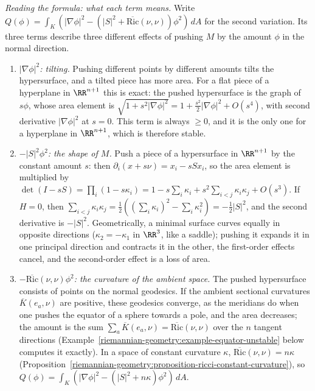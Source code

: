 \begin{remark}\label{riemannian-geometry:remark-variation-area-riemannian}
\emph{Reading the formula: what each term means.} Write $Q(\phi) = \int_K(|\nabla\phi|^2 - (|S|^2 + \overline{\mathrm{Ric}}(\nu, \nu))\phi^2)\,dA$ for the second variation. Its three terms
describe three different effects of pushing $M$ by the amount $\phi$ in the normal direction.
\begin{enumerate}
\item \emph{$|\nabla\phi|^2$: tilting.} Pushing different points by different amounts tilts the hypersurface, and a tilted piece has more area. For a flat piece of a hyperplane in
$\RR^{n+1}$ this is exact: the pushed hypersurface is the graph of $s\phi$, whose area element is $\sqrt{1 + s^2|\nabla\phi|^2} = 1 + \frac{s^2}2|\nabla\phi|^2 + O(s^4)$, with second
derivative $|\nabla\phi|^2$ at $s = 0$. This term is always $\geq 0$, and it is the only one for a hyperplane in $\RR^{n+1}$, which is therefore stable.
\item \emph{$-|S|^2\phi^2$: the shape of $M$.} Push a piece of a hypersurface in $\RR^{n+1}$ by the constant amount $s$: then $\partial_i(x + s\nu) = x_i - sSx_i$, so the area element is
multiplied by $\det(I - sS) = \prod_i(1 - s\kappa_i) = 1 - s\sum_i\kappa_i + s^2\sum_{i<j}\kappa_i\kappa_j + O(s^3)$. If $H = 0$, then
$\sum_{i<j}\kappa_i\kappa_j = \frac12((\sum_i\kappa_i)^2 - \sum_i\kappa_i^2) = -\frac12|S|^2$, and the second derivative is $-|S|^2$. Geometrically, a minimal surface curves equally in
opposite directions ($\kappa_2 = -\kappa_1$ in $\RR^3$, like a saddle); pushing it expands it in one principal direction and contracts it in the other, the first-order effects cancel,
and the second-order effect is a loss of area.
\item \emph{$-\overline{\mathrm{Ric}}(\nu, \nu)\phi^2$: the curvature of the ambient space.} The pushed hypersurface consists of points on the normal geodesics. If the ambient sectional
curvatures $\overline{K}(e_a, \nu)$ are positive, these geodesics converge, as the meridians do when one pushes the equator of a sphere towards a pole, and the area decreases; the
amount is the sum $\sum_a\overline{K}(e_a, \nu) = \overline{\mathrm{Ric}}(\nu, \nu)$ over the $n$ tangent directions (Example~\ref{riemannian-geometry:example-equator-unstable} below
computes it exactly). In a space of constant curvature $\kappa$, $\overline{\mathrm{Ric}}(\nu, \nu) = n\kappa$ (Proposition~\ref{riemannian-geometry:proposition-ricci-constant-curvature}),
so $Q(\phi) = \int_K(|\nabla\phi|^2 - (|S|^2 + n\kappa)\phi^2)\,dA$.
\end{enumerate}


\end{remark}
